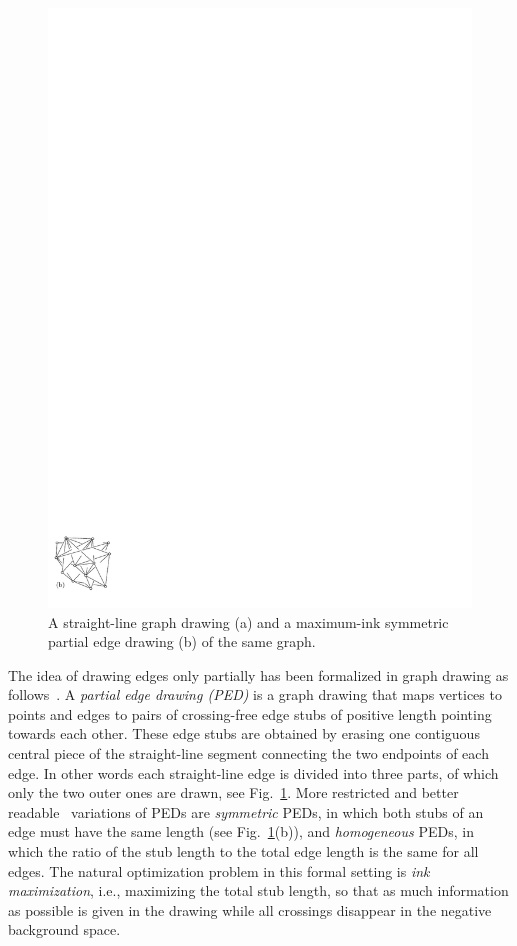 \documentclass[a4paper,english,numberwithinsect]{eurocg18}
\begin{document}
\begin{figure}
	\includegraphics{export_alpha_nontouching}
	\caption{A straight-line graph drawing (a) and a maximum-ink symmetric partial edge drawing (b) of the same graph.}
	\label{fig:examples}
\end{figure}


The idea of drawing edges only partially has been formalized in graph drawing as follows~\cite{bk-ecbe-12}. 
A \emph{partial edge drawing (PED)} is a graph drawing that maps vertices to points and edges to pairs of crossing-free edge stubs of positive length pointing towards each other.
These edge stubs are obtained by erasing one contiguous central piece of the straight-line segment connecting the two endpoints of each edge.
In other words each straight-line edge is divided into three parts, of which only the two outer ones are drawn, see Fig.~\ref{fig:examples}.
More restricted and better readable~\cite{blmt-pedhmitc-16} variations of PEDs are \emph{symmetric} PEDs, in which both stubs of an edge must have the same length (see Fig.~\ref{fig:examples}(b)), and \emph{homogeneous} PEDs, in which the ratio of the stub length to the total edge length is the same for all edges.
The natural optimization problem in this formal setting is \emph{ink maximization}, i.e., maximizing the total stub length, so that as much information as possible is given in the drawing while all crossings disappear in the negative background space. 
\end{document}
